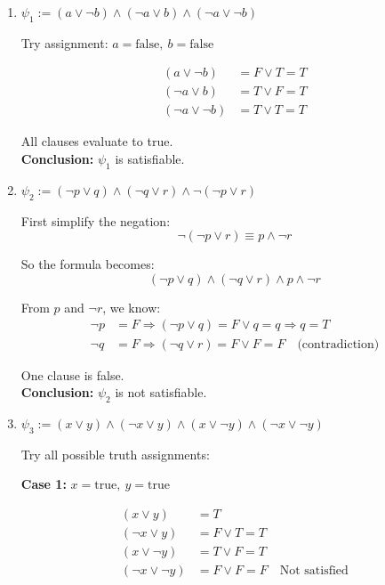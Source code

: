 \documentclass{article}
\theoremstyle{theorem}
\theoremstyle{definition}
\theoremstyle{remark}
\begin{document}
\begin{enumerate}
    \item $\psi_1 := (a \lor \neg b) \land (\neg a \lor b) \land (\neg a \lor \neg b)$

    \begin{flushleft}
    Try assignment: $a = \text{false},\ b = \text{false}$

    \begin{align*}
    (a \lor \neg b) &= F \lor T = T \\
    (\neg a \lor b) &= T \lor F = T \\
    (\neg a \lor \neg b) &= T \lor T = T
    \end{align*}

    All clauses evaluate to true.\\
    \textbf{Conclusion:} $\psi_1$ is satisfiable.
    \end{flushleft}

    \item $\psi_2 := (\neg p \lor q) \land (\neg q \lor r) \land \neg(\neg p \lor r)$

    \begin{flushleft}
    First simplify the negation:
    \[
    \neg(\neg p \lor r) \equiv p \land \neg r
    \]

    So the formula becomes:
    \[
    (\neg p \lor q) \land (\neg q \lor r) \land p \land \neg r
    \]

    From $p$ and $\neg r$, we know:
    \begin{align*}
    \neg p &= F \Rightarrow (\neg p \lor q) = F \lor q = q \Rightarrow q = T \\
    \neg q &= F \Rightarrow (\neg q \lor r) = F \lor F = F \quad \text{(contradiction)}
    \end{align*}

    One clause is false.\\
    \textbf{Conclusion:} $\psi_2$ is not satisfiable.
    \end{flushleft}

    \item $\psi_3 := (x \lor y) \land (\neg x \lor y) \land (x \lor \neg y) \land (\neg x \lor \neg y)$

    \begin{flushleft}
    Try all possible truth assignments:

    \textbf{Case 1:} $x = \text{true},\ y = \text{true}$

    \begin{align*}
    (x \lor y) &= T \\
    (\neg x \lor y) &= F \lor T = T \\
    (x \lor \neg y) &= T \lor F = T \\
    (\neg x \lor \neg y) &= F \lor F = F \quad \text{Not satisfied}
    \end{align*}


\end{flushleft}
\end{enumerate}
\end{document}
